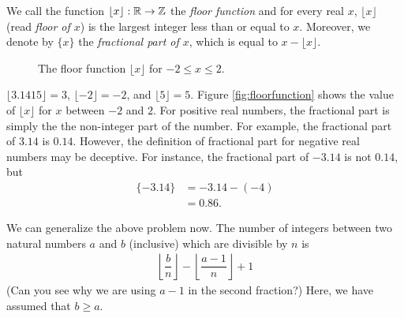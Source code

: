 \documentclass[12pt]{subfile}
\begin{document}
        \begin{definition}
			We call the function $\lfloor x \rfloor: \mathbb{R} \to \mathbb Z$ the \textit{floor function} and for every real $x$, $\lfloor x\rfloor$ (read \textit{floor of $x$}) is the largest integer less than or equal to $x$. Moreover, we denote by $\{x\}$ the \textit{fractional part of $x$}, which is equal to $x-\lfloor x\rfloor$.
			
			\begin{figure}
				\centering
				\caption{The floor function $\lfloor x \rfloor$ for $-2 \leq x \leq 2$.}
				\label{fig:floorfunction}
			\end{figure}
			
		\end{definition}
		
		\begin{example}
			$\lfloor 3.1415\rfloor=3$, $\lfloor-2\rfloor=-2$, and $\lfloor5\rfloor=5$. Figure \eqref{fig:floorfunction} shows the value of $\lfloor x \rfloor$ for $x$ between $-2$ and $2$. For positive real numbers, the fractional part is simply the the non-integer part of the number. For example, the fractional part of  $3.14$ is $0.14$. However, the definition of fractional part for negative real numbers may be deceptive. For instance, the fractional part of $-3.14$ is not $0.14$, but
			    \begin{align*}
			        \{-3.14\} &= -3.14 - (-4)\\
			                  &= 0.86.
			    \end{align*}
		\end{example}
		
	We can generalize the above problem now. The number of integers between two natural numbers $a$ and $b$ (inclusive) which are divisible by $n$ is
		\begin{align*} 	          
		    \left\lfloor\dfrac{b}{n}\right\rfloor-\left\lfloor\dfrac{a-1}{n}\right\rfloor+1
	    \end{align*}
	(Can you see why we are using $a-1$ in the second fraction?) Here, we have assumed that $b\geq a$.
	    
\end{document}

